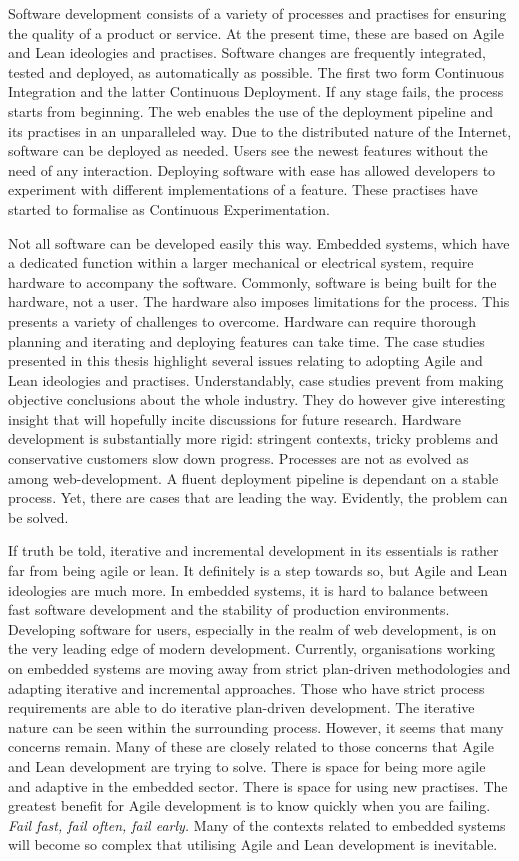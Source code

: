 \documentclass[english]{tktltiki2}
\begin{document}
Software development consists of a variety of processes and practises for ensuring the quality of a product or service. At the present time, these are based on Agile and Lean ideologies and practises. Software changes are frequently integrated, tested and deployed, as automatically as possible. The first two form Continuous Integration and the latter Continuous Deployment. If any stage fails, the process starts from beginning. The web enables the use of the deployment pipeline and its practises in an unparalleled way. Due to the distributed nature of the Internet, software can be deployed as needed. Users see the newest features without the need of any interaction. Deploying software with ease has allowed developers to experiment with different implementations of a feature. These practises have started to formalise as Continuous Experimentation.

Not all software can be developed easily this way. Embedded systems, which have a dedicated function within a larger mechanical or electrical system, require hardware to accompany the software. Commonly, software is being built for the hardware, not a user. The hardware also imposes limitations for the process. This presents a variety of challenges to overcome. Hardware can require thorough planning and iterating and deploying features can take time. The case studies presented in this thesis highlight several issues relating to adopting Agile and Lean ideologies and practises. Understandably, case studies prevent from making objective conclusions about the whole industry. They do however give interesting insight that will hopefully incite discussions for future research. Hardware development is substantially more rigid: stringent contexts, tricky problems and conservative customers slow down progress. Processes are not as evolved as among web-development. A fluent deployment pipeline is dependant on a stable process. Yet, there are cases that are leading the way. Evidently, the problem can be solved.

If truth be told, iterative and incremental development in its essentials is rather far from being agile or lean. It definitely is a step towards so, but Agile and Lean ideologies are much more. In embedded systems, it is hard to balance between fast software development and the stability of production environments. Developing software for users, especially in the realm of web development, is on the very leading edge of modern development. Currently, organisations working on embedded systems are moving away from strict plan-driven methodologies and adapting iterative and incremental approaches. Those who have strict process requirements are able to do iterative plan-driven development. The iterative nature can be seen within the surrounding process. However, it seems that many concerns remain. Many of these are closely related to those concerns that Agile and Lean development are trying to solve. There is space for being more agile and adaptive in the embedded sector. There is space for using new practises. The greatest benefit for Agile development is to know quickly when you are failing. \emph{Fail fast, fail often, fail early.} Many of the contexts related to embedded systems will become so complex that utilising Agile and Lean development is inevitable.
\end{document}
